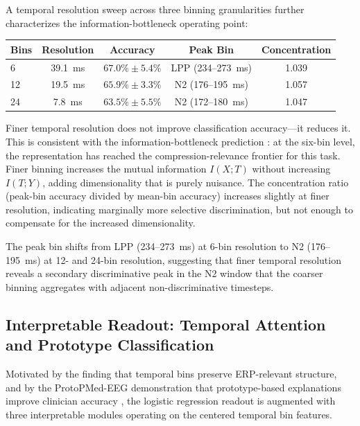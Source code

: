 A temporal resolution sweep across three binning granularities further characterizes the information-bottleneck operating point:
\begin{center}
\begin{tabular}{lcccc}
\toprule
\textbf{Bins} & \textbf{Resolution} & \textbf{Accuracy} & \textbf{Peak Bin} & \textbf{Concentration} \\
\midrule
6  & 39.1~ms & $67.0\% \pm 5.4\%$ & LPP (234--273~ms) & 1.039 \\
12 & 19.5~ms & $65.9\% \pm 3.3\%$ & N2 (176--195~ms)  & 1.057 \\
24 & 7.8~ms  & $63.5\% \pm 5.5\%$ & N2 (172--180~ms)  & 1.047 \\
\bottomrule
\end{tabular}
\end{center}
Finer temporal resolution does not improve classification accuracy---it reduces it. This is consistent with the information-bottleneck prediction \cite{tishby_deep_2015}: at the six-bin level, the representation has reached the compression-relevance frontier for this task. Finer binning increases the mutual information $I(X; T)$ without increasing $I(T; Y)$, adding dimensionality that is purely nuisance. The concentration ratio (peak-bin accuracy divided by mean-bin accuracy) increases slightly at finer resolution, indicating marginally more selective discrimination, but not enough to compensate for the increased dimensionality.

The peak bin shifts from LPP (234--273~ms) at 6-bin resolution to N2 (176--195~ms) at 12- and 24-bin resolution, suggesting that finer temporal resolution reveals a secondary discriminative peak in the N2 window that the coarser binning aggregates with adjacent non-discriminative timesteps.

\subsection{Interpretable Readout: Temporal Attention and Prototype Classification}
\label{sec:interpretable_readout}

Motivated by the finding that temporal bins preserve ERP-relevant structure, and by the ProtoPMed-EEG demonstration that prototype-based explanations improve clinician accuracy \cite{barnett_protopmed_2024}, the logistic regression readout is augmented with three interpretable modules operating on the centered temporal bin features.

